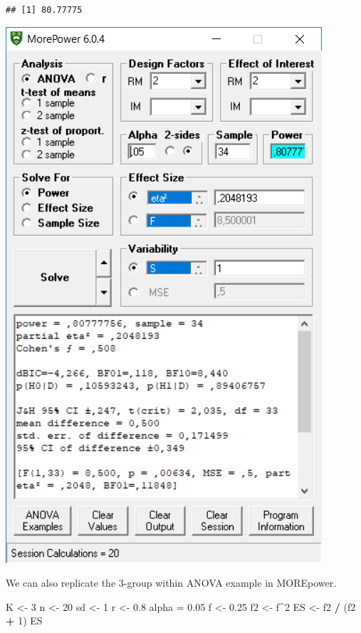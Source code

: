 \documentclass[]{book}
\newenvironment{Shaded}{\begin{snugshade}}{\end{snugshade}}
\newcommand{\DecValTok}[1]{\textcolor[rgb]{0.00,0.00,0.81}{#1}}
\newcommand{\FloatTok}[1]{\textcolor[rgb]{0.00,0.00,0.81}{#1}}
\newcommand{\NormalTok}[1]{#1}
\newcommand{\OperatorTok}[1]{\textcolor[rgb]{0.81,0.36,0.00}{\textbf{#1}}}
\newcommand{\StringTok}[1]{\textcolor[rgb]{0.31,0.60,0.02}{#1}}
\begin{document}
\begin{Shaded}
\end{Shaded}

\begin{verbatim}
## [1] 80.77775
\end{verbatim}

\includegraphics{screenshots/morepower_2.png}

We can also replicate the 3-group within ANOVA example in MOREpower.

\begin{Shaded}
\begin{Highlighting}[]
\NormalTok{K <-}\StringTok{ }\DecValTok{3}
\NormalTok{n <-}\StringTok{ }\DecValTok{20}
\NormalTok{sd <-}\StringTok{ }\DecValTok{1}
\NormalTok{r <-}\StringTok{ }\FloatTok{0.8}
\NormalTok{alpha =}\StringTok{ }\FloatTok{0.05}
\NormalTok{f <-}\StringTok{ }\FloatTok{0.25}
\NormalTok{f2 <-}\StringTok{ }\NormalTok{f}\OperatorTok{^}\DecValTok{2}
\NormalTok{ES <-}\StringTok{ }\NormalTok{f2 }\OperatorTok{/}\StringTok{ }\NormalTok{(f2 }\OperatorTok{+}\StringTok{ }\DecValTok{1}\NormalTok{)}
\NormalTok{ES}
\end{Highlighting}
\end{Shaded}
\end{document}
